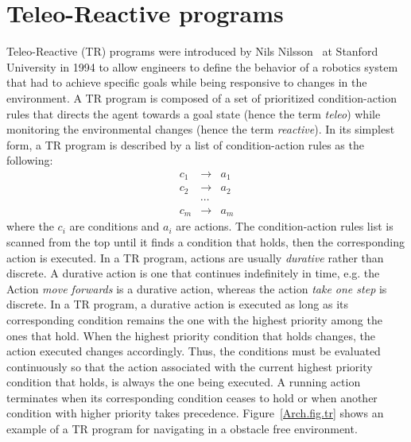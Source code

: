 %






\section{Teleo-Reactive programs}
\label{sec:TR}
\label{architectures.tr}
Teleo-Reactive\label{definition:TR} (TR) programs were introduced by Nils Nilsson~\cite{nilsson1994teleo} at Stanford University in 1994 to allow engineers to define the behavior of a robotics system that had to achieve specific goals while being responsive to changes in the environment. A TR program is composed of a set of prioritized condition-action rules that directs the agent towards a goal state (hence the term \emph{teleo}) while monitoring the environmental changes (hence the term \emph{reactive}). In its simplest form, a TR program is described by a list of condition-action rules as the following:
\begin{eqnarray*}
c_1 &\rightarrow& a_1 \\
 c_2  &\rightarrow& a_2 \\
 &\cdots \\
  c_m  &\rightarrow& a_m
\end{eqnarray*}
where the $c_i$ are conditions and $a_i$ are actions. The condition-action rules list is scanned from the top until it finds a condition that holds, then the corresponding action is executed. In a TR program, actions are usually \emph{durative} rather than discrete. A durative action is one that continues indefinitely in time, e.g. the Action \emph{move forwards} is a durative action, whereas the action \emph{take one step} is discrete. In a TR program, a durative action is executed as long as its corresponding condition remains the one with the highest priority among the ones that hold. When the highest priority condition that holds changes, the action executed changes accordingly. Thus, the conditions must be evaluated continuously so that the action associated with the current highest priority condition that holds, is always the one
being executed. A running action terminates when its corresponding condition ceases to hold or when another condition with higher priority takes precedence. Figure~\ref{Arch.fig.tr} shows an example of a TR program for navigating in a obstacle free environment.


